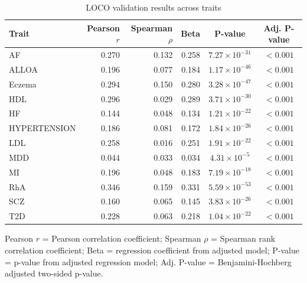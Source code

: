 \begin{table}[htbp]
\centering
\caption{LOCO validation results across traits}
\label{tab:loco-validation}
\begin{tabular}{lrrrcc}
\toprule
Trait & Pearson $r$ & Spearman $\rho$ & Beta & P-value & Adj. P-value \\
\midrule
AF & 0.270 & 0.132 & 0.258 & $7.27 \times 10^{-31}$ & $<0.001$ \\
ALLOA & 0.196 & 0.077 & 0.184 & $1.17 \times 10^{-46}$ & $<0.001$ \\
Eczema & 0.294 & 0.150 & 0.280 & $3.28 \times 10^{-47}$ & $<0.001$ \\
HDL & 0.296 & 0.029 & 0.289 & $3.71 \times 10^{-30}$ & $<0.001$ \\
HF & 0.144 & 0.048 & 0.134 & $1.21 \times 10^{-22}$ & $<0.001$ \\
HYPERTENSION & 0.186 & 0.081 & 0.172 & $1.84 \times 10^{-26}$ & $<0.001$ \\
LDL & 0.258 & 0.016 & 0.251 & $1.91 \times 10^{-22}$ & $<0.001$ \\
MDD & 0.044 & 0.033 & 0.034 & $4.31 \times 10^{-5}$ & $<0.001$ \\
MI & 0.196 & 0.048 & 0.183 & $7.19 \times 10^{-18}$ & $<0.001$ \\
RhA & 0.346 & 0.159 & 0.331 & $5.59 \times 10^{-53}$ & $<0.001$ \\
SCZ & 0.160 & 0.065 & 0.145 & $3.83 \times 10^{-26}$ & $<0.001$ \\
T2D & 0.228 & 0.063 & 0.218 & $1.04 \times 10^{-22}$ & $<0.001$ \\
\bottomrule
\end{tabular}
\begin{tablenotes}
\small
\item Pearson $r$ = Pearson correlation coefficient; Spearman $\rho$ = Spearman rank correlation coefficient; Beta = regression coefficient from adjusted model; P-value = p-value from adjusted regression model; Adj. P-value = Benjamini-Hochberg adjusted two-sided p-value.
\end{tablenotes}
\end{table}
